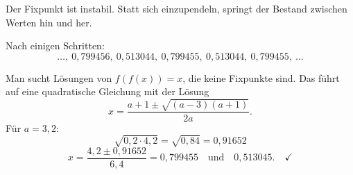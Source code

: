 \begin{merksatz}
Der Fixpunkt ist instabil. Statt sich einzupendeln, springt der Bestand zwischen  Werten hin und her.

Nach einigen Schritten:
\[ \ldots,\ 0{,}799456,\ 0{,}513044,\ 0{,}799455,\ 0{,}513044,\ 0{,}799455,\ \ldots \]

Man sucht Lösungen von $f(f(x)) = x$, die keine Fixpunkte sind. Das führt auf eine quadratische Gleichung mit der Lösung
\[ x = \frac{a+1 \pm \sqrt{(a-3)(a+1)}}{2a} . \]
Für $a = 3{,}2$:
\[ \sqrt{0{,}2 \cdot 4{,}2} = \sqrt{0{,}84} = 0{,}91652 \]
\[ x = \frac{4{,}2 \pm 0{,}91652}{6{,}4} = 0{,}799455 \quad\text{und}\quad 0{,}513045 . \quad \checkmark \]

\begin{center}
\begin{minipage}{0.88\textwidth}
\end{minipage}
\end{center}
\end{merksatz}

